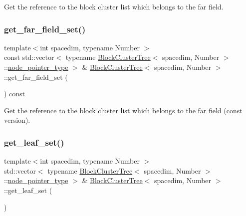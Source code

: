 Get the reference to the block cluster list which belongs to the far field. \mbox{\label{classBlockClusterTree_a93763855c84100e1a9da3080737295f4}} 
\subsubsection{\texorpdfstring{get\+\_\+far\+\_\+field\+\_\+set()}{get\_far\_field\_set()}\hspace{0.1cm}{\footnotesize\ttfamily [2/2]}}
{\footnotesize\ttfamily template$<$int spacedim, typename Number $>$ \\
const std\+::vector$<$ typename \hyperlink{classBlockClusterTree}{Block\+Cluster\+Tree}$<$ spacedim, Number $>$\+::\hyperlink{classTreeNode}{node\+\_\+pointer\+\_\+type} $>$ \& \hyperlink{classBlockClusterTree}{Block\+Cluster\+Tree}$<$ spacedim, Number $>$\+::get\+\_\+far\+\_\+field\+\_\+set (\begin{DoxyParamCaption}{ }\end{DoxyParamCaption}) const}

Get the reference to the block cluster list which belongs to the far field (const version). \mbox{\label{classBlockClusterTree_a162b396d814b420f96289425529852e9}} 
\subsubsection{\texorpdfstring{get\+\_\+leaf\+\_\+set()}{get\_leaf\_set()}\hspace{0.1cm}{\footnotesize\ttfamily [1/2]}}
{\footnotesize\ttfamily template$<$int spacedim, typename Number $>$ \\
std\+::vector$<$ typename \hyperlink{classBlockClusterTree}{Block\+Cluster\+Tree}$<$ spacedim, Number $>$\+::\hyperlink{classTreeNode}{node\+\_\+pointer\+\_\+type} $>$ \& \hyperlink{classBlockClusterTree}{Block\+Cluster\+Tree}$<$ spacedim, Number $>$\+::get\+\_\+leaf\+\_\+set (\begin{DoxyParamCaption}{ }\end{DoxyParamCaption})}

